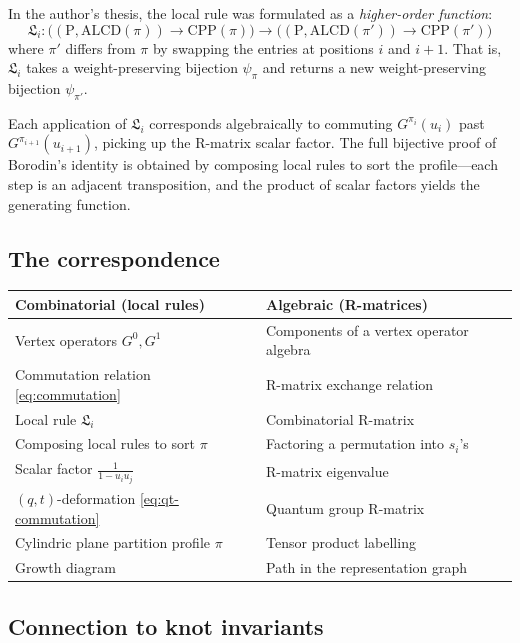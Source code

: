 \documentclass[12pt]{article}
\begin{document}
In the author's thesis, the local rule was formulated as a
\emph{higher-order function}:
\begin{equation}
  \mathfrak{L}_i :
    \bigl((\mathrm{P}, \mathrm{ALCD}(\pi)) \to \mathrm{CPP}(\pi)\bigr)
    \to
    \bigl((\mathrm{P}, \mathrm{ALCD}(\pi')) \to \mathrm{CPP}(\pi')\bigr)
\end{equation}
where $\pi'$ differs from $\pi$ by swapping the entries at positions $i$
and $i+1$. That is, $\mathfrak{L}_i$ takes a weight-preserving bijection
$\psi_\pi$ and returns a new weight-preserving bijection $\psi_{\pi'}$.

Each application of $\mathfrak{L}_i$ corresponds algebraically to commuting
$G^{\pi_i}(u_i)$ past $G^{\pi_{i+1}}(u_{i+1})$, picking up the R-matrix
scalar factor. The full bijective proof of Borodin's identity is
obtained by composing local rules to sort the profile---each step is an
adjacent transposition, and the product of scalar factors yields the
generating function.

\subsection{The correspondence}

\begin{center}
\begin{tabular}{ll}
\hline
\textbf{Combinatorial (local rules)} & \textbf{Algebraic (R-matrices)} \\
\hline
Vertex operators $G^0, G^1$ & Components of a vertex operator algebra \\
Commutation relation \eqref{eq:commutation} & R-matrix exchange relation \\
Local rule $\mathfrak{L}_i$ & Combinatorial R-matrix \\
Composing local rules to sort $\pi$ & Factoring a permutation into $s_i$'s \\
Scalar factor $\frac{1}{1-u_iu_j}$ & R-matrix eigenvalue \\
$(q,t)$-deformation \eqref{eq:qt-commutation} & Quantum group R-matrix \\
Cylindric plane partition profile $\pi$ & Tensor product labelling \\
Growth diagram & Path in the representation graph \\
\hline
\end{tabular}
\end{center}

\subsection{Connection to knot invariants}
\end{document}
